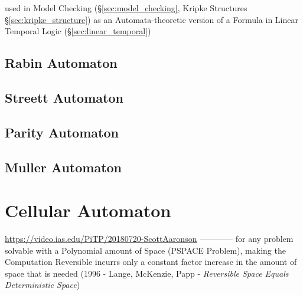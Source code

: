 used in Model Checking (\S\ref{sec:model_checking}, Kripke Structures
\S\ref{sec:kripke_structure}) as an Automata-theoretic version of a
Formula in Linear Temporal Logic (\S\ref{sec:linear_temporal})



\subsection{Rabin Automaton}\label{sec:rabin_automaton}

\subsection{Streett Automaton}\label{sec:streett_automaton}

\subsection{Parity Automaton}\label{sec:parity_automaton}

\subsection{Muller Automaton}\label{sec:muller_automaton}



\section{Cellular Automaton}\label{sec:cellular_automaton}

\url{https://video.ias.edu/PiTP/20180720-ScottAaronson} ------------
for any problem solvable with a Polynomial amount of Space (PSPACE Problem),
making the Computation Reversible incurrs only a constant factor increase in the
amount of space that is needed (1996 - Lange, McKenzie, Papp - \emph{Reversible
  Space Equals Deterministic Space})

